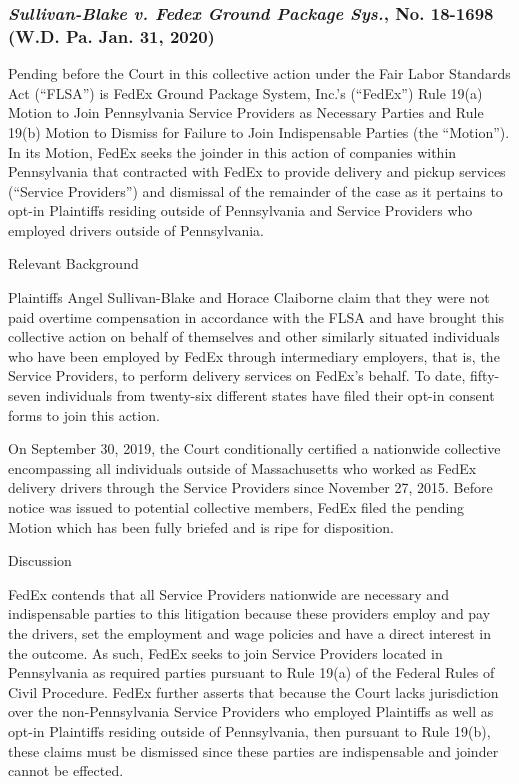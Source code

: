 \documentclass[11pt,letterpaper,twoside]{article}
\begin{document}
\subsubsection{\texorpdfstring{\emph{Sullivan-Blake v. Fedex Ground
Package Sys.}, No. 18-1698 (W.D. Pa. Jan. 31,
2020)}{Sullivan-Blake v. Fedex Ground Package Sys., No. 18-1698 (W.D. Pa. Jan. 31, 2020)}}\label{sullivanblakefedexgroundpackage_wdpa2020}

Pending before the Court in this collective action under the Fair Labor
Standards Act (``FLSA'') is FedEx Ground Package System, Inc.'s
(``FedEx'') Rule 19(a) Motion to Join Pennsylvania Service Providers as
Necessary Parties and Rule 19(b) Motion to Dismiss for Failure to Join
Indispensable Parties (the ``Motion''). In its Motion, FedEx seeks the
joinder in this action of companies within Pennsylvania that contracted
with FedEx to provide delivery and pickup services (``Service
Providers'') and dismissal of the remainder of the case as it pertains
to opt-in Plaintiffs residing outside of Pennsylvania and Service
Providers who employed drivers outside of Pennsylvania.

{Relevant Background}

Plaintiffs Angel Sullivan-Blake and Horace Claiborne claim that they
were not paid overtime compensation in accordance with the FLSA and have
brought this collective action on behalf of themselves and other
similarly situated individuals who have been employed by FedEx through
intermediary employers, that is, the Service Providers, to perform
delivery services on FedEx's behalf. To date, fifty-seven individuals
from twenty-six different states have filed their opt-in consent forms
to join this action.

On September 30, 2019, the Court conditionally certified a nationwide
collective encompassing all individuals outside of Massachusetts who
worked as FedEx delivery drivers through the Service Providers since
November 27, 2015. Before notice was issued to potential collective
members, FedEx filed the pending Motion which has been fully briefed and
is ripe for disposition.

{Discussion}

FedEx contends that all Service Providers nationwide are necessary and
indispensable parties to this litigation because these providers employ
and pay the drivers, set the employment and wage policies and have a
direct interest in the outcome. As such, FedEx seeks to join Service
Providers located in Pennsylvania as required parties pursuant to Rule
19(a) of the Federal Rules of Civil Procedure. FedEx further asserts
that because the Court lacks jurisdiction over the non-Pennsylvania
Service Providers who employed Plaintiffs as well as opt-in Plaintiffs
residing outside of Pennsylvania, then pursuant to Rule 19(b), these
claims must be dismissed since these parties are indispensable and
joinder cannot be effected.
\end{document}
